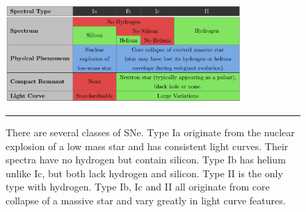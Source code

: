 \begin{figure}[htbp]
	\centering
		\includegraphics[width = 0.8\textwidth]{./Figures/lise_thesis_SDSS.jpg}
		\rule{35em}{0.5pt}
	\caption[Supernovae Types]{There are several classes of SNe. Type Ia originate from the nuclear explosion of a low mass star and has consistent light curves. Their spectra have no hydrogen but contain silicon. Type Ib has helium unlike Ic, but both lack hydrogen and silicon. Type II is the only type with hydrogen. Type Ib, Ic and II all originate from core collapse of a massive star and vary greatly in light curve features.}
	\label{fig:supernovae_types}
\end{figure}

